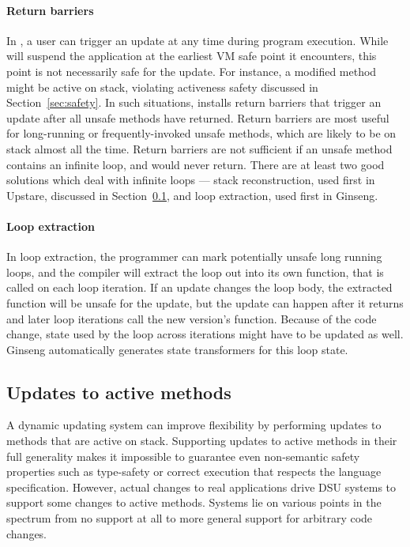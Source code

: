 \paragraph{Return barriers}
In \JV, a user can trigger an update at any time during program execution.
While \JV will suspend the application at the earliest VM safe point it
encounters, this point is not necessarily safe for the update. For instance, a
modified method might be active on stack, violating activeness safety
discussed in Section~\ref{sec:safety}. In such situations, \JV
installs return barriers that trigger an update after all unsafe methods
have returned. Return barriers are most useful for long-running or
frequently-invoked unsafe methods, which are likely to be on stack almost
all the time. Return barriers are not sufficient if an unsafe method
contains an infinite loop, and would never return. There are at least two
good solutions which deal with infinite loops ---
stack reconstruction, used first in Upstare, discussed in
Section~\ref{subsec:updates-active-methods}, and
loop extraction, used
first in Ginseng.

\paragraph{Loop extraction}
In loop extraction, the programmer can mark potentially unsafe long running
loops, and the compiler will extract the loop out into its own function,
that is called on each loop iteration. If an update changes the loop body,
the extracted function will be unsafe for the update, but the update can
happen after it returns and later loop iterations call the new version's
function. Because of the code change, state used by the loop across
iterations might have to be updated as well. Ginseng automatically
generates state transformers for this loop state.

\subsection{Updates to active methods}
\label{subsec:updates-active-methods}
A dynamic updating system can improve flexibility by performing updates to
methods that are active on stack. Supporting updates to active methods in
their full generality makes it impossible to guarantee even non-semantic
safety properties such as type-safety or correct execution that respects
the language specification. However, actual changes to real applications
drive DSU systems to support some changes to active methods. Systems lie on
various points in the spectrum from no support at all to more general
support for arbitrary code changes.

